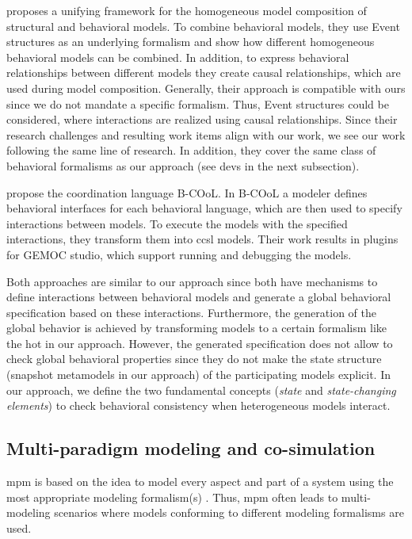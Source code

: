 \documentclass{jot}
\begin{document}
\cite{kienzleUnifyingFrameworkHomogeneous2019} proposes a unifying framework for the homogeneous model composition of structural and behavioral models.
To combine behavioral models, they use Event structures as an underlying formalism and show how different homogeneous behavioral models can be combined.
In addition, to express behavioral relationships between different models they create causal relationships, which are used during model composition. 
Generally, their approach is compatible with ours since we do not mandate a specific formalism.
Thus, Event structures could be considered, where interactions are realized using causal relationships.
Since their research challenges and resulting work items align with our work, we see our work following the same line of research.
In addition, they cover the same class of behavioral formalisms as our approach (see \acrshort*{devs} in the next subsection).

\cite{varalarsenBehavioralCoordinationOperator2015} propose the coordination language B-COoL.
In B-COoL a modeler defines behavioral interfaces for each behavioral language, which are then used to specify interactions between models.
To execute the models with the specified interactions, they transform them into \gls*{ccsl} models.  
Their work results in plugins for GEMOC studio, which support running and debugging the models.

Both approaches \cite{kienzleUnifyingFrameworkHomogeneous2019,varalarsenBehavioralCoordinationOperator2015} are similar to our approach since both have mechanisms to define interactions between behavioral models and generate a global behavioral specification based on these interactions.
Furthermore, the generation of the global behavior is achieved by transforming models to a certain formalism like the \gls*{hot} in our approach.
However, the generated specification does not allow to check global behavioral properties since they do not make the state structure (snapshot metamodels in our approach) of the participating models explicit.
In our approach, we define the two fundamental concepts (\textit{state} and \textit{state-changing elements}) to check behavioral consistency when heterogeneous models interact.

\subsection{Multi-paradigm modeling and co-simulation}
\gls*{mpm} is based on the idea to model every aspect and part of a system using the most appropriate modeling formalism(s) \cite{amraniMultiparadigmModellingCyber2021}.
Thus, \gls*{mpm} often leads to multi-modeling scenarios where models conforming to different modeling formalisms are used.
\end{document}
